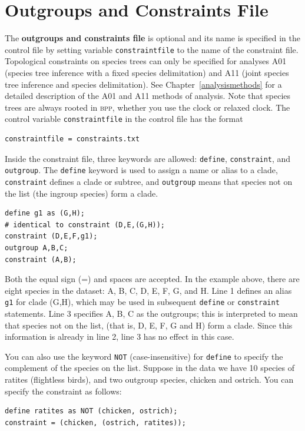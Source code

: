 \documentclass{book}
\numberwithin{equation}{section} \renewcommand{\baselinestretch}{0.55}
\begin{document}
\section{Outgroups and Constraints File}
The \textbf{outgroups and constraints file} is optional and its name is
specified in the control file by setting variable
\texttt{constraintfile} to the name of the constraint file.
Topological constraints on species trees can only be specified for
analyses A01 (species tree inference with a fixed species
delimitation) and A11 (joint species tree inference and species
delimitation). See Chapter~\ref{analysismethods} for a detailed
description of the A01 and A11 methods of analysis.  Note that species
trees are always rooted in \textsc{bpp}, whether you use the clock or
relaxed clock. The control variable \texttt{constraintfile} in the
control file has the format
\begin{verbatim}
constraintfile = constraints.txt
\end{verbatim}
Inside the constraint file, three keywords are allowed:
\texttt{define}, \texttt{constraint}, and \texttt{outgroup}.  The
\texttt{define} keyword is used to assign a name or alias to a clade,
\texttt{constraint} defines a clade or subtree, and \texttt{outgroup}
means that species not on the list (the ingroup species) form a clade.
\begin{verbatim}
define g1 as (G,H);
# identical to constraint (D,E,(G,H));
constraint (D,E,F,g1);   
outgroup A,B,C;
constraint (A,B);
\end{verbatim}
Both the equal sign (=) and spaces are accepted. In the example above,
there are eight species in the dataset: A, B, C, D, E, F, G, and H.
Line 1 defines an alias \texttt{g1} for clade (G,H), which may be used
in subsequent \texttt{define} or \texttt{constraint} statements. Line
3 specifies A, B, C as the outgroups; this is interpreted to mean that
species not on the list, (that is, D, E, F, G and H) form a
clade. Since this information is already in line 2, line 3 has no
effect in this case.

You can also use the keyword \texttt{NOT} (case-insensitive) for
\texttt{define} to specify the complement of the species on the
list. Suppose in the data we have 10 species of ratites (flightless
birds), and two outgroup species, chicken and ostrich. You can specify
the constraint as follows:
\begin{verbatim}
define ratites as NOT (chicken, ostrich);
constraint = (chicken, (ostrich, ratites));
\end{verbatim}
\end{document}
